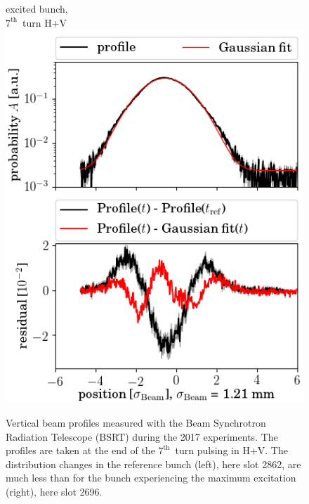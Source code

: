 \documentclass[%
 reprint,
 amsmath,amssymb,
 aps,
prstab,
]{revtex4-1}
\begin{document}
\begin{figure}[h]
\begin{minipage}[t]{0.49\linewidth}
		excited bunch,\\ $7^{\mathrm{th}}$~turn H+V		\includegraphics[width=1.0\linewidth]{profile_v_7thhv_slot_2696.png}
	\end{minipage}
	\caption{\label{fig:7thexpprof} Vertical beam profiles measured with the Beam Synchrotron Radiation Telescope (BSRT) during the 2017 experiments. The profiles are taken at the end of the $7^{\mathrm{th}}$~turn pulsing in H+V. The distribution changes in the reference bunch (left), here slot 2862, are much less than for the bunch experiencing the maximum excitation (right), here slot 2696.}
\end{figure}
\end{document}
